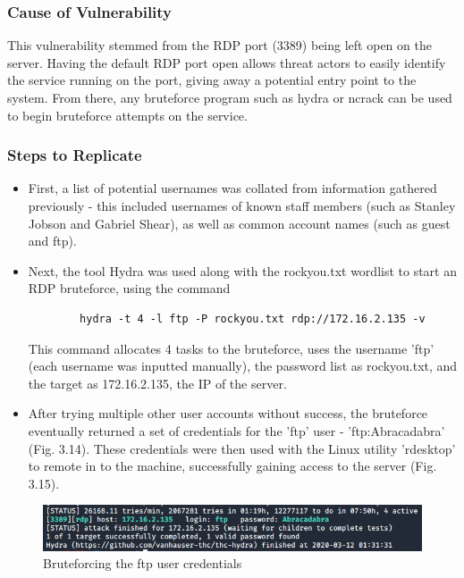 \documentclass{report}
\begin{document}
\subsubsection{Cause of Vulnerability}
This vulnerability stemmed from the RDP port (3389) being left open on the server. Having the default RDP port open allows threat actors to easily identify the service running on the port, giving away a potential entry point to the system. From there, any bruteforce program such as hydra or ncrack can be used to begin bruteforce attempts on the service.
\subsubsection{Steps to Replicate}
\begin{itemize}
	\item First, a list of potential usernames was collated from information gathered previously - this included usernames of known staff members (such as Stanley Jobson and Gabriel Shear), as well as common account names (such as guest and ftp). 
	\item Next, the tool Hydra was used along with the rockyou.txt wordlist to start an RDP bruteforce, using the command 
	\begin{verbatim}
		hydra -t 4 -l ftp -P rockyou.txt rdp://172.16.2.135 -v
	\end{verbatim}
	This command allocates 4 tasks to the bruteforce, uses the username 'ftp' (each username was inputted manually), the password list as rockyou.txt, and the target as 172.16.2.135, the IP of the server.
	\item After trying multiple other user accounts without success, the bruteforce eventually returned a set of credentials for the 'ftp' user - 'ftp:Abracadabra' (Fig. 3.14). These credentials were then used with the Linux utility 'rdesktop' to remote in to the machine, successfully gaining access to the server (Fig. 3.15).
\end{itemize}
\begin{figure}[!htb]
	\centering
	\includegraphics[scale=0.6]{img/rdp1.png}
	\caption{Bruteforcing the ftp user credentials}
\end{figure}
\end{document}
